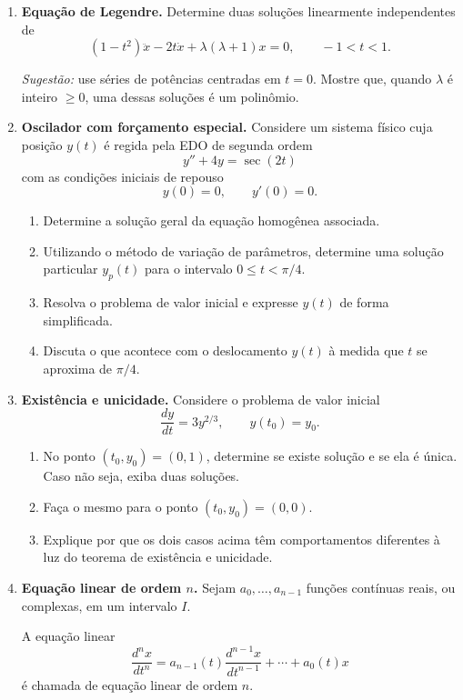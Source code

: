 \documentclass[a4paper,11pt,reqno]{amsart}
\begin{document}
\begin{enumerate}
\item \textbf{Equação de Legendre.}
Determine duas soluções linearmente independentes de
\[
    (1 - t^2)\ddot{x} - 2t\dot{x} + \lambda(\lambda + 1)x = 0,
    \qquad -1 < t < 1.
\]

\emph{Sugestão:} use séries de potências centradas em $t = 0$. Mostre que, quando $\lambda$ é inteiro $\geq 0$, uma dessas soluções é um polinômio.


\item \textbf{Oscilador com forçamento especial.}
Considere um sistema físico cuja posição $y(t)$ é regida pela EDO de segunda ordem
\[
    y'' + 4y = \sec(2t)
\]
com as condições iniciais de repouso
\[
    y(0)=0,
    \qquad
    y'(0)=0.
\]

\begin{enumerate}
    \item Determine a solução geral da equação homogênea associada.
    \item Utilizando o método de variação de parâmetros, determine uma solução particular $y_p(t)$ para o intervalo $0\leq t<\pi/4$.
    \item Resolva o problema de valor inicial e expresse $y(t)$ de forma simplificada.
    \item Discuta o que acontece com o deslocamento $y(t)$ à medida que $t$ se aproxima de $\pi/4$.
\end{enumerate}


\item \textbf{Existência e unicidade.}
Considere o problema de valor inicial
\[
    \frac{dy}{dt}=3y^{2/3},
    \qquad
    y(t_0)=y_0.
\]

\begin{enumerate}
    \item No ponto $(t_0,y_0)=(0,1)$, determine se existe solução e se ela é única. Caso não seja, exiba duas soluções.
    \item Faça o mesmo para o ponto $(t_0,y_0)=(0,0)$.
    \item Explique por que os dois casos acima têm comportamentos diferentes à luz do teorema de existência e unicidade.
\end{enumerate}


\item \textbf{Equação linear de ordem $n$.}
Sejam $a_0,\ldots,a_{n-1}$ funções contínuas reais, ou complexas, em um intervalo $I$.

A equação linear
\[
\frac{d^n x}{dt^n}
=
a_{n-1}(t)\frac{d^{n-1}x}{dt^{n-1}}
+\cdots+a_0(t)x
\tag{*}
\]
é chamada de equação linear de ordem $n$.


\end{enumerate}
\end{document}
